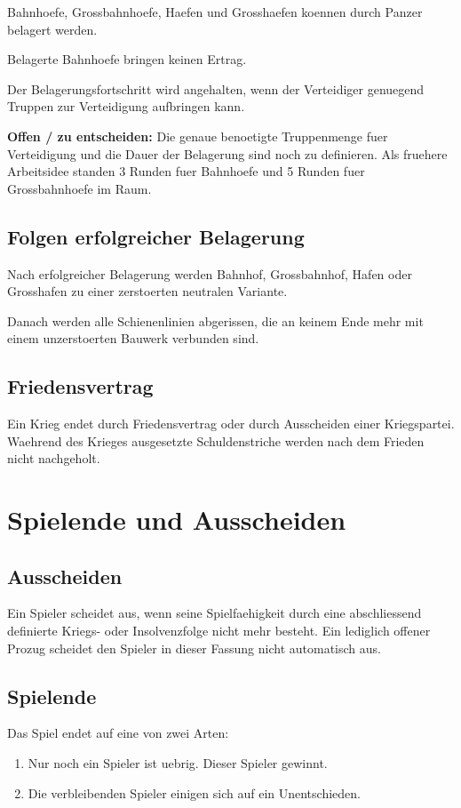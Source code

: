 \documentclass[11pt,a4paper,oneside,parskip=half]{scrreprt}
\newcommand{\offen}[1]{\begin{framed}\noindent\textbf{Offen / zu entscheiden:} #1\end{framed}}
\begin{document}
Bahnhoefe, Grossbahnhoefe, Haefen und Grosshaefen koennen durch Panzer belagert werden.

Belagerte Bahnhoefe bringen keinen Ertrag.

Der Belagerungsfortschritt wird angehalten, wenn der Verteidiger genuegend Truppen zur Verteidigung aufbringen kann.

\offen{Die genaue benoetigte Truppenmenge fuer Verteidigung und die Dauer der Belagerung sind noch zu definieren. Als fruehere Arbeitsidee standen 3 Runden fuer Bahnhoefe und 5 Runden fuer Grossbahnhoefe im Raum.}

\section{Folgen erfolgreicher Belagerung}
Nach erfolgreicher Belagerung werden Bahnhof, Grossbahnhof, Hafen oder Grosshafen zu einer zerstoerten neutralen Variante.

Danach werden alle Schienenlinien abgerissen, die an keinem Ende mehr mit einem
unzerstoerten Bauwerk verbunden sind.

\section{Friedensvertrag}
Ein Krieg endet durch Friedensvertrag oder durch Ausscheiden einer Kriegspartei. Waehrend des Krieges ausgesetzte Schuldenstriche werden nach dem Frieden nicht nachgeholt.

\chapter{Spielende und Ausscheiden}

\section{Ausscheiden}
Ein Spieler scheidet aus, wenn seine Spielfaehigkeit durch eine abschliessend definierte Kriegs- oder Insolvenzfolge nicht mehr besteht. Ein lediglich offener Prozug scheidet den Spieler in dieser Fassung nicht automatisch aus.

\section{Spielende}
Das Spiel endet auf eine von zwei Arten:
\begin{enumerate}
  \item Nur noch ein Spieler ist uebrig. Dieser Spieler gewinnt.
  \item Die verbleibenden Spieler einigen sich auf ein Unentschieden.
\end{enumerate}
\end{document}
